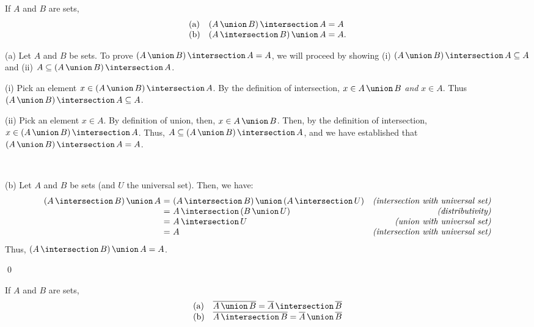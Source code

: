 \begin{thmex}\label{theorem:absorption}
If $A$ and $B$ are sets,
\[\begin{array}{ll}
\textrm{(a)} & \setintersection{(\setunion{A}{B})}{A}= A \\
\textrm{(b)} & \setunion{(\setintersection{A}{B})}{A} = A.
\end{array}\]
\begin{proofex}

(a) Let $A$ and $B$ be sets. To prove $\setintersection{(\setunion{A}{B})}{A}= A$, we will proceed by showing (i) $\setintersection{(\setunion{A}{B})}{A} \subseteq A$ and (ii) $A \subseteq \setintersection{(\setunion{A}{B})}{A}$. 

(i) Pick an element $x \in \setintersection{(\setunion{A}{B})}{A}$. By the definition of intersection, $x \in \setunion A B$ \emph{and} $x \in A$. Thus $\setintersection{(\setunion{A}{B})}{A} \subseteq A$.

(ii) Pick an element $x \in A$. By definition of union, then, $x \in \setunion{A}{B}$. Then, by the definition of intersection, $x \in \setintersection{(\setunion{A}{B})}{A}$. Thus, $A \subseteq \setintersection{(\setunion{A}{B})}{A}$, and we have established that $\setintersection{(\setunion{A}{B})}{A}= A$.

~

\noindent (b) Let $A$ and $B$ be sets (and $U$ the universal set). Then, we have:
\[\begin{array}{r@{\ =\ }lr}
\setunion{(\setintersection{A}{B})}{A} & \setunion{(\setintersection{A}{B})}{(\setintersection{A}{U)}} 
		& \textit{(intersection with universal set)} \\
		& \setintersection{A}{(\setunion{B}{U})} & \textit{(distributivity)} \\
		& \setintersection{A}{U}	& \textit{(union with universal set)} \\
		& A & \textit{(intersection with universal set)} 
\end{array}\]
Thus, $\setunion{(\setintersection{A}{B})}{A} = A$.

\qed
\end{proofex}
\end{thmex}

\begin{thm2}\label{theorem:demorgans}
If $A$ and $B$ are sets,
\[\begin{array}{ll} 
\textrm{(a)} &  \setcomplement{\setunion{A}{B}} = \setintersection{\setcomplement{A}}{\setcomplement{B}}
\\
\textrm{(b)} & \setcomplement{\setintersection{A}{B}} = \setunion{\setcomplement{A}}{\setcomplement{B}}
\end{array}\]
\end{thm2}

